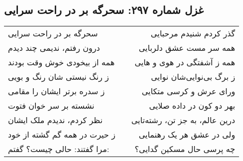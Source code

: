 \begin{center}
\section*{غزل شماره ۲۹۷: سحرگه بر در راحت سرایی}
\label{sec:297}
\begin{longtable}{l p{0.5cm} r}
سحرگه بر در راحت سرایی
&&
گذر کردم شنیدم مرحبایی
\\
درون رفتم، ندیمی چند دیدم
&&
همه سر مست عشق دلربایی
\\
همه از بیخودی خوش وقت بودند
&&
همه ز آشفتگی در هوی و هایی
\\
ز رنگ نیستی شان رنگ و بویی
&&
ز برگ بی‌نوایی‌شان نوایی
\\
ز سدره برتر ایشان را مقامی
&&
ورای عرش و کرسی متکایی
\\
نشسته بر سر خوان فتوت
&&
بهر دو کون در داده صلایی
\\
نظر کردم، ندیدم ملک ایشان
&&
درین عالم، به جز تن، رشته‌تایی
\\
ز حیرت در همه گم گشته از خود
&&
ولی در عشق هر یک رهنمایی
\\
مرا گفتند: حالی چیست؟ گفتم:
&&
چه پرسی حال مسکین گدایی؟
\\
\end{longtable}
\end{center}
